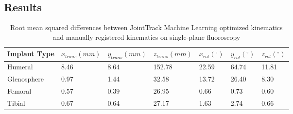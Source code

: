 \subsection{Results}
\begin{table}[h!]
	\caption{Root mean squared differences between JointTrack Machine Learning optimized kinematics and manually registered kinematics on single-plane fluoroscopy} \label{tab:jtml-tsa-tka-vals}
	\begin{tabularx}{\linewidth}{|X|X|X|X|X|X|X|}\hline
		{\bf Implant Type} & $x_{trans} (mm)$ & $y_{trans} (mm)$ & $z_{trans} (mm)$ & $x_{rot} (^{\circ})$ & $y_{rot} (^{\circ})$ & $z_{rot} (^{\circ})$ \\ \hline
		Humeral            & 8.46             & 8.64             & 152.78           & 22.59                & 64.74                & 11.81                \\\hline
		Glenosphere        & 0.97             & 1.44             & 32.58            & 13.72                & 26.40                & 8.30                 \\\hline
		Femoral            & 0.57             & 0.39             & 26.95            & 0.66                 & 0.73                 & 0.60                 \\\hline
		Tibial             & 0.67             & 0.64             & 27.17            & 1.63                 & 2.74                 & 0.66                 \\\hline
	\end{tabularx}
  \end{table}

